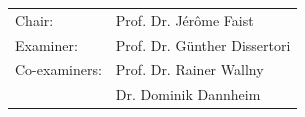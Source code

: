 \documentclass[hyperref={colorlinks=true,pdfpagelabels=false,linkcolor=black}, xcolor=dvipsnames,10pt]{beamer}
\begin{document}
{\begin{frame}
    \vspace{-0.2cm}
    \scriptsize{
      \begin{tabular}{l l}
        Chair: & Prof. Dr. J\'{e}r\^{o}me Faist \\
        Examiner: & Prof. Dr. G\"{u}nther Dissertori\\
        Co-examiners: &Prof. Dr. Rainer Wallny \\
        &  Dr. Dominik Dannheim \\
      \end{tabular}
    }

  \end{frame}
}


\end{document}
